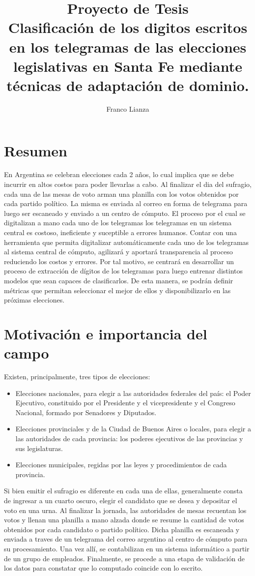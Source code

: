 \documentclass[a4paper, twoside]{report}
\title{Proyecto de Tesis\\ \large Clasificaci\'on de los digitos escritos en los telegramas de las elecciones legislativas en Santa Fe mediante
t\'ecnicas de adaptaci\'on de dominio.}
\author{Franco Lianza}
\begin{document}

\newpage

\section*{Resumen}

En Argentina se celebran elecciones cada 2 a\~{n}os, lo cual implica que se debe incurrir en altos costos para poder
llevarlas a cabo. Al finalizar el dia del sufragio, cada una de las mesas de voto arman una planilla con los votos
obtenidos por cada partido pol\'itico. La misma es enviada al correo en forma de telegrama para luego ser escaneado y
enviado a un centro de c\'omputo. El proceso por el cual se digitalizan a mano cada uno de los telegramas los
telegramas en un sistema central es costoso, ineficiente y suceptible a errores humanos. Contar con una herramienta que
permita digitalizar autom\'aticamente cada uno de los telegramas al sistema central de c\'omputo, agilizar\'a y
aportar\'a transparencia al proceso reduciendo los costos y errores. Por tal motivo, se centrar\'a en desarrollar un
proceso de extracci\'on de d\'igitos de los telegramas para luego entrenar distintos modelos que sean capaces de
clasificarlos. De esta manera, se podr\'an definir m\'etricas que permitan seleccionar el mejor de ellos y
disponibilizarlo en las pr\'oximas elecciones.

\section*{Motivación e importancia del campo}

Existen, principalmente, tres tipos de elecciones:

\begin{itemize}
	\item Elecciones nacionales, para elegir a las autoridades federales del país: el Poder Ejecutivo, constituido por el
	      Presidente y el vicepresidente y el Congreso Nacional, formado por Senadores y Diputados.
	\item Elecciones provinciales y de la Ciudad de Buenos Aires o locales, para elegir a las autoridades de cada provincia: los
	      poderes ejecutivos de las provincias y sus legislaturas.
	\item Elecciones municipales, regidas por las leyes y procedimientos de cada provincia.
\end{itemize}

Si bien emitir el sufragio es diferente en cada una de ellas, generalmente consta de ingresar a un cuarto oscuro,
elegir el candidato que se desea y depositar el voto en una urna. Al finalizar la jornada, las autoridades de mesas
recuentan los votos y llenan una planilla a mano alzada donde se resume la cantidad de votos obtenidos por cada
candidato o partido pol\'itico. Dicha planilla es escaneada y enviada a traves de un telegrama del correo argentino al
centro de c\'omputo para su procesamiento. Una vez all\'i, se contabilizan en un sistema inform\'atico a partir de un
grupo de empleados. Finalmente, se procede a una etapa de validaci\'on de los datos para constatar que lo computado
coincide con lo escrito.
\end{document}
